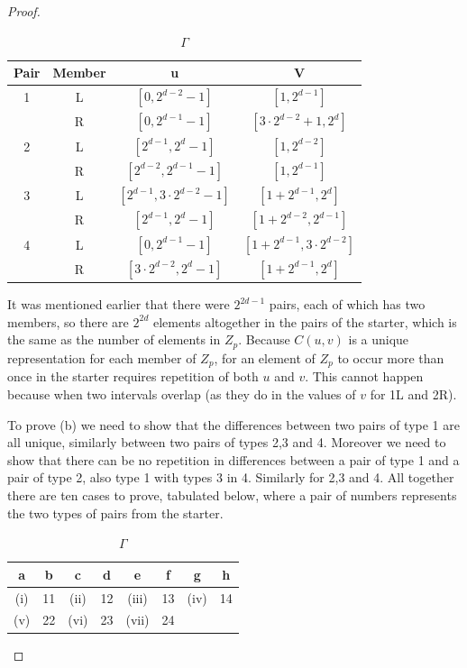 \documentclass[
  11pt,
  a4paper]{book}
\begin{document}
\begin{proof}
\begin{table}
\caption{\label{tab:unnamed-chunk-4}$\Gamma$}
\centering
\begin{tabular}[t]{cccc}
\toprule
Pair & Member & u & V\\
\midrule
1 & L & $[0,2^{d-2}-1]$ & $[1,2^{d-1}]$\\
 & R & $[0,2^{d-1}-1]$ & $[3 \cdot 2^{d-2}+1,2^{d}]$\\
2 & L & $[2^{d-1},2^{d}-1]$ & $[1,2^{d-2}]$\\
 & R & $[2^{d-2},2^{d-1}-1]$ & $[1,2^{d-1}]$\\
3 & L & $[2^{d-1},3 \cdot 2^{d-2}-1]$ & $[1+2^{d-1},2^{d}]$\\
\addlinespace
 & R & $[2^{d-1},2^{d}-1]$ & $[1+ 2^{d-2},2^{d-1}]$\\
4 & L & $[0,2^{d-1}-1]$ & $[1+ 2^{d-1},3 \cdot 2^{d-2}]$\\
 & R & $[3 \cdot 2^{d-2},2^{d}-1]$ & $[1+2^{d-1},2^{d}]$\\
\bottomrule
\end{tabular}
\end{table}

It was mentioned earlier that there were $2^{2d - 1}$ pairs,
each of which has two members, so there are $2^{2d}$
elements altogether in the pairs of the starter, which is
the same as the number of elements in $Z_p$.  Because
$C(u, v)$ is a unique representation for each member of
$Z_p$, for an element of $Z_p$ to occur more than once in
the starter requires repetition of both $u$ and $v$. This
cannot happen because when two intervals overlap (as they do
in the values of $v$ for 1L and 2R).

To prove (b) we need to show that the differences between
two pairs of type 1 are all unique, similarly between two
pairs of types 2,3 and 4.  Moreover we need to show that
there can be no repetition in differences between a pair of
type 1 and a pair of type 2, also type 1 with types 3 in 4.
Similarly for 2,3 and 4. All together there are ten cases to
prove, tabulated below, where a pair of numbers represents
the two types of pairs from the starter.

\begin{table}

\caption{\label{tab:unnamed-chunk-5}$\Gamma$}
\centering
\begin{tabular}[t]{cccccccc}
\toprule
a & b & c & d & e & f & g & h\\
\midrule
(i) & 11 & (ii) & 12 & (iii) & 13 & (iv) & 14\\
(v) & 22 & (vi) & 23 & (vii) & 24 &  & \\
\bottomrule
\end{tabular}
\end{table}


\end{proof}
\end{document}
